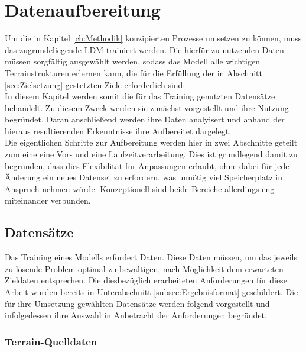 
\chapter{Datenaufbereitung}

Um die in Kapitel \ref{ch:Methodik} konzipierten Prozesse umsetzen zu können, muss das zugrundeliegende LDM trainiert werden. Die hierfür zu nutzenden Daten müssen sorgfältig ausgewählt werden, sodass das Modell alle wichtigen Terrainstrukturen erlernen kann, die für die Erfüllung der in Abschnitt \ref{sec:Zielsetzung} gestetzten Ziele erforderlich sind. \\
In diesem Kapitel werden somit die für das Training genutzten Datensätze behandelt. Zu diesem Zweck werden sie zunächst vorgestellt und ihre Nutzung begründet. Daran anschließend werden ihre Daten analyisert und anhand der hieraus resultierenden Erkenntnisse ihre Aufbereitet dargelegt. \\
Die eigentlichen Schritte zur Aufbereitung werden hier in zwei Abschnitte geteilt zum eine eine Vor- und eine Laufzeitverarbeitung. Dies ist grundlegend damit zu begründen, dass dies Flexibilität für Anpassungen erlaubt, ohne dabei für jede Änderung ein neues Datenset zu erfordern, was unnötig viel Speicherplatz in Anspruch nehmen würde. Konzeptionell sind beide Bereiche allerdings eng miteinander verbunden.

\section{Datensätze}

Das Training eines Modells erfordert Daten. Diese Daten müssen, um das jeweils zu lösende Problem optimal zu bewältigen, nach Möglichkeit dem erwarteten Zieldaten entsprechen. Die diesbezüglich erarbeiteten Anforderungen für diese Arbeit wurden bereits in Unterabschnitt \ref{subsec:Ergebnisformat} geschildert. Die für ihre Umsetzung gewählten Datensätze werden folgend vorgestellt und infolgedessen ihre Auswahl in Anbetracht der Anforderungen begründet.

\subsection{Terrain-Quelldaten}

